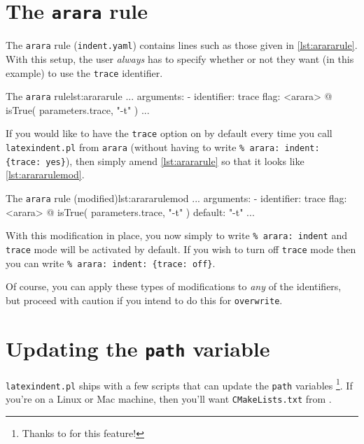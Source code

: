 \documentclass[11pt]{article}
\begin{document}
\section{The \lstinline!arara! rule}
The \lstinline!arara! rule (\lstinline!indent.yaml!) contains lines such as those
given in \cref{lst:arararule}. With this setup, the user \emph{always} has
to specify whether or not they want (in this example) to use the \lstinline!trace!
identifier.
\begin{cmhlistings}[style=yaml,numbers=none]{The \lstinline!arara! rule}{lst:arararule}
...
arguments:
- identifier: trace
  flag: <arara> @{ isTrue( parameters.trace, "-t" ) }
...
\end{cmhlistings}

If you would like to have the \lstinline!trace! option on by default every time you
call \lstinline!latexindent.pl! from \lstinline!arara! (without having to write \lstinline!% arara: indent: {trace: yes}!), then simply
amend \cref{lst:arararule} so that it looks like \cref{lst:arararulemod}.
\begin{cmhlistings}[style=yaml,numbers=none]{The \lstinline!arara! rule (modified)}{lst:arararulemod}
...
arguments:
- identifier: trace
  flag: <arara> @{ isTrue( parameters.trace, "-t" ) }
  default: "-t"
...
\end{cmhlistings}

With this modification in place, you now simply to write \lstinline!% arara: indent! and
\lstinline!trace! mode will be activated by default. If you wish to turn off \lstinline!trace!
mode then you can write \lstinline!% arara: indent: {trace: off}!.

Of course, you can apply these types of modifications to \emph{any} of the identifiers,
but proceed with caution if you intend to do this for \lstinline!overwrite!.

\section{Updating the \lstinline!path! variable}\label{sec:updating-path}
\lstinline!latexindent.pl! ships with a few scripts that can update the \lstinline!path! variables
\footnote{Thanks to \cite{jasjuang} for this feature!}. If you're
on a Linux or Mac machine, then you'll want \lstinline!CMakeLists.txt! from \cite{latexindent-home}.
\end{document}
